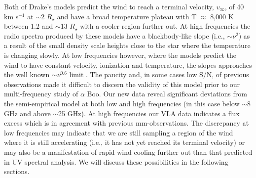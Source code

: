 \documentclass[iop]{emulateapj}
\begin{document}
Both of Drake's models predict the wind to reach a terminal velocity, $v_{\infty}$, of 40 km s${}^{-1}$ at $\sim$2 $R _{\star}$ and have a broad temperature plateau with T $\approx$ 8,000 K between 1.2 and $\sim$13 $R _{\star}$ with a cooler region further out. At high frequencies the radio spectra produced by these models have a blackbody-like slope (i.e., $\sim\nu ^{2}$) as a result of the small density scale heights close to the star where the temperature is changing slowly. At low frequencies however, where the models predict the wind to have constant velocity, ionization and temperature, the slopes approaches the well known $\sim\nu ^{0.6}$ limit \citep{1975MNRAS.170...41W,1975AA....39..217O,1975AA....39....1P}. The paucity and, in some cases low S/N, of previous observations made it difficult to discern the validity of this model prior to our multi-frequency study of $\alpha$ Boo. Our new data reveal significant deviations from the semi-empirical model at both low and high frequencies (in this case below $\sim$8 GHz and above $\sim$25 GHz). At high frequencies our VLA data indicates a flux excess which is in agreement with previous mm-observations. The  discrepancy at low frequencies may indicate that we are still sampling a region of the wind where it is still accelerating (i.e., it has not yet reached its terminal velocity) or may also be a manifestation of rapid wind cooling further out than that predicted in UV spectral analysis. We will discuss these possibilities in the following sections.
\end{document}
